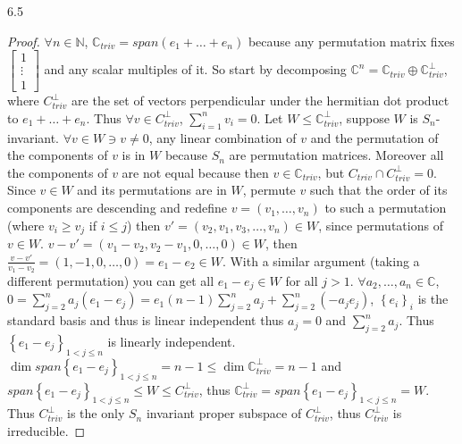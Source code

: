 \documentclass{article}
\newcommand{\C}{\mathbb{C}}
\newcommand{\N}{\mathbb{N}}
\begin{document}
\begin{PROB}{6.5}\label{Problem 6.5.}
\end{PROB}
\begin{proof}
    $\forall n \in \N$, $\C_{triv} = span(e_1 + \dots + e_n)$ because any permutation matrix fixes $\begin{bmatrix}
        1 \\ \vdots \\ 1
    \end{bmatrix}$ and any scalar multiples of it. So start by decomposing $\C^n = \C_{triv} \oplus \C_{triv}^{\perp}$, where $C_{triv}^{\perp}$ are the set of vectors perpendicular under the hermitian dot product to $e_1 + \dots + e_n$. Thus $\forall v \in C_{triv}^{\perp}$, $\sum_{i = 1}^{n} v_i = 0$. Let $W \leq \C_{triv}^{\perp}$, suppose $W$ is $S_n$-invariant. $\forall v \in W \ni v \neq 0$, any linear combination of $v$ and the permutation of the components of $v$ is in $W$ because $S_n$ are permutation matrices. Moreover all the components of $v$ are not equal because then $v \in \C_{triv}$, but $C_{triv} \cap C_{triv}^\perp = 0$. Since $v \in W$ and its permutations are in $W$, permute $v$ such that the order of its components are descending and redefine $v = (v_1, \dots, v_n)$ to such a permutation (where $v_i \geq v_j$ if $i \leq j$) then $v' = (v_2, v_1, v_3, \dots, v_n) \in W$, since permutations of $v \in W$. $v - v' = (v_1 - v_2, v_2 - v_1, 0, \dots, 0) \in W$, then $\frac{v - v'}{v_1 - v_2} = (1, -1, 0, \dots, 0) = e_1 - e_2 \in W$. With a similar argument (taking a different permutation) you can get all $e_1 - e_j \in W$ for all $j > 1$. $\forall a_2, \dots, a_{n} \in \C$, $0 = \sum_{j = 2}^{n} a_j(e_1 - e_j) = e_1(n - 1)\sum_{j = 2}^{n} a_j + \sum_{j = 2}^{n}(-a_je_j)$, $\left\{ e_i \right\}_i$ is the standard basis and thus is linear independent thus $a_j = 0$ and $\sum_{j = 2}^{n} a_j$. Thus $\left\{ e_1 - e_j \right\}_{1<j\leq n}$ is linearly independent. $\dim span{\left\{ e_1 - e_j \right\}_{1<j\leq n}} = n - 1 \leq \dim \C_{triv}^\perp = n-1$ and $span{\left\{ e_1 - e_j \right\}_{1<j\leq n}} \leq W \leq C_{triv}^\perp$, thus $\C_{triv}^\perp = span{\left\{ e_1 - e_j \right\}_{1<j\leq n}}= W$. Thus $C_{triv}^\perp$ is the only $S_n$ invariant proper subspace of $C_{triv}^\perp$, thus $C_{triv}^\perp$ is irreducible.                                  
\end{proof}

\bigskip
\end{document}
